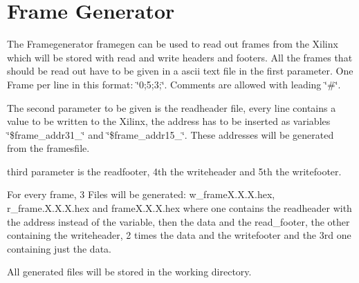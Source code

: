 \hypertarget{group__framegen}{
\section{Frame Generator}
\label{group__framegen}
}
The Framegenerator framegen can be used to read out frames from the Xilinx which will be stored with read and write headers and footers.  
All the frames that should be read out have to be given in a ascii text file in the first parameter. One Frame per line in this format: \char`\"{}0;5;3;\char`\"{}. Comments are allowed with leading \char`\"{}\#\char`\"{}.

The second parameter to be given is the readheader file, every line contains a value to be written to the Xilinx, the address has to be inserted as variables \char`\"{}\$frame\_\-addr31\_\char`\"{} and \char`\"{}\$frame\_\-addr15\_\char`\"{}. These addresses will be generated from the framesfile.

third parameter is the readfooter, 4th the writeheader and 5th the writefooter.

For every frame, 3 Files will be generated: w\_\-frame\-X.X.X.hex, r\_\-frame.X.X.X.hex and frame\-X.X.X.hex where one contains the readheader with the address instead of the variable, then the data and the read\_\-footer, the other containing the writeheader, 2 times the data and the writefooter and the 3rd one containing just the data.

All generated files will be stored in the working directory. 